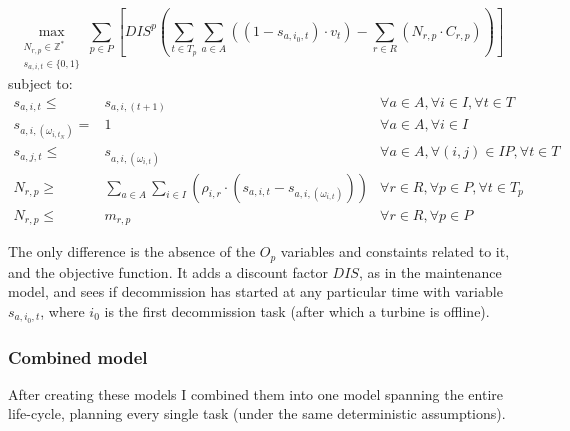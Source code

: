 \documentclass[a4paper,12pt]{article}
\begin{document}
\small
\begin{equation}
	\max_{\substack{N_{r,p} \in \mathbb{Z}^* \\
	s_{a,i,t} \in \{0, 1\}}} 
	\sum_{p \in P} [ DIS^p (\sum_{t\in T_p} \sum_{a \in A} ((1 - s_{a,i_0,t}) \cdot v_t)  - \sum_{r\in R} (N_{r,p} \cdot C_{r,p})) ]
\end{equation}
subject to:
\begin{align}		
s_{a,i,t} \leq& s_{a,i,(t+1)}											&	\forall a \in A, \forall i \in I, \forall t \in T				\\
s_{a,i,(\omega_{i,t_N})} =& 1											&	\forall a \in A, \forall i \in I						\\
s_{a,j,t} \leq& s_{a,i,(\omega_{i,t})}										&	\forall a \in A, \forall (i, j) \in IP, \forall t \in T 			\\
N_{r,p} \geq& \sum_{a \in A}\sum_{i\in I} (\rho_{i,r} \cdot (s_{a,i,t} - s_{a,i,(\omega_{i,t})}))	& 	\forall r \in R, \forall p \in P, \forall t \in T_p			\\
N_{r,p} \leq& m_{r,p}												& 	\forall r \in R, \forall p \in P
\end{align}
\normalsize

The only difference is the absence of the $O_p$ variables and constaints related to it, and the objective function. It adds a discount factor $DIS$, as in the maintenance model, and sees if decommission has started at any particular time with variable $s_{a,i_0,t}$, where $i_0$ is the first decommission task (after which a turbine is offline).

\subsubsection{Combined model}

After creating these models I combined them into one model spanning the entire life-cycle, planning every single task (under the same deterministic assumptions).
\end{document}
